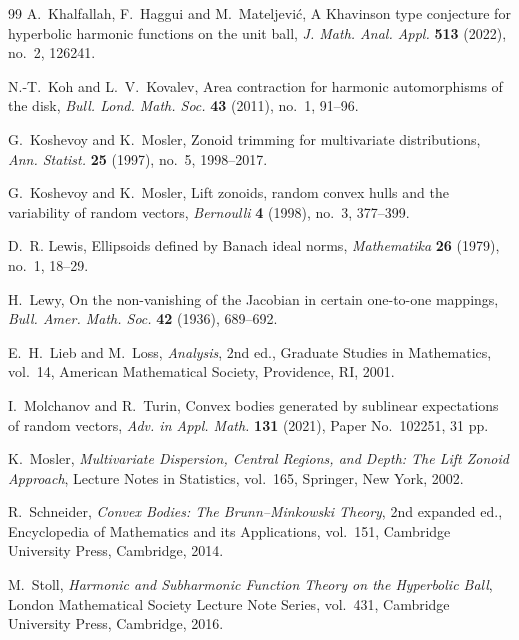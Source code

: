 \documentclass[11pt,reqno]{amsart}
\theoremstyle{remark}
\begin{document}
\begin{thebibliography}{99}
A.~Khalfallah, F.~Haggui and M.~Mateljevi\'c,
\newblock A Khavinson type conjecture for hyperbolic harmonic functions on the unit ball,
\newblock \emph{J. Math. Anal. Appl.} \textbf{513} (2022), no.~2, 126241.

N.-T.~Koh and L.~V.~Kovalev,
\newblock Area contraction for harmonic automorphisms of the disk,
\newblock \emph{Bull. Lond. Math. Soc.}
\textbf{43} (2011), no.~1, 91--96.

G.~Koshevoy and K.~Mosler,
\newblock Zonoid trimming for multivariate distributions,
\newblock \emph{Ann. Statist.}
\textbf{25} (1997), no.~5, 1998--2017.

G.~Koshevoy and K.~Mosler,
\newblock Lift zonoids, random convex hulls and the variability of random vectors,
\newblock \emph{Bernoulli}
\textbf{4} (1998), no.~3, 377--399.

D.~R. Lewis,
\newblock Ellipsoids defined by Banach ideal norms,
\newblock \emph{Mathematika} \textbf{26} (1979), no.~1, 18--29.

H.~Lewy,
\newblock On the non-vanishing of the Jacobian in certain one-to-one mappings,
\newblock \emph{Bull. Amer. Math. Soc.}
\textbf{42} (1936), 689--692.

E.~H.~Lieb and M.~Loss,
\newblock \emph{Analysis},
\newblock 2nd ed., Graduate Studies in Mathematics, vol.~14,
American Mathematical Society, Providence, RI, 2001.

I.~Molchanov and R.~Turin,
\newblock Convex bodies generated by sublinear expectations of random vectors,
\newblock \emph{Adv. in Appl. Math.} \textbf{131} (2021),
Paper No.~102251, 31 pp.

K.~Mosler,
\newblock \emph{Multivariate Dispersion, Central Regions, and Depth:
The Lift Zonoid Approach},
\newblock Lecture Notes in Statistics, vol.~165,
Springer, New York, 2002.

R.~Schneider,
\newblock \emph{Convex Bodies: The Brunn--Minkowski Theory},
\newblock 2nd expanded ed., Encyclopedia of Mathematics and its Applications,
vol.~151, Cambridge University Press, Cambridge, 2014.

M.~Stoll,
\newblock \emph{Harmonic and Subharmonic Function Theory on the Hyperbolic Ball},
\newblock London Mathematical Society Lecture Note Series, vol.~431,
Cambridge University Press, Cambridge, 2016.

\end{thebibliography}
\end{document}
